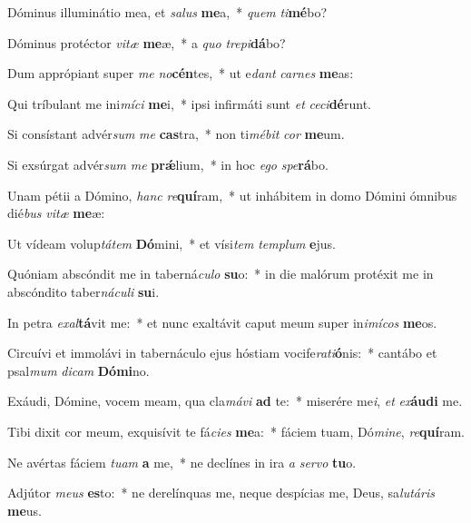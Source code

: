 \item Dóminus illuminátio mea, et \textit{sa}\textit{lus} \textbf{me}a,~* \textit{quem} \textit{ti}\textbf{mé}bo?
\item Dóminus protéctor \textit{vi}\textit{tæ} \textbf{me}æ,~* a \textit{quo} \textit{tre}\textit{pi}\textbf{dá}bo?
\item Dum apprópiant super \textit{me} \textit{no}\textbf{cén}tes,~* ut e\textit{dant} \textit{car}\textit{nes} \textbf{me}as:
\item Qui tríbulant me ini\textit{mí}\textit{ci} \textbf{me}i,~* ipsi infirmáti sunt \textit{et} \textit{ce}\textit{ci}\textbf{dé}runt.
\item Si consístant advér\textit{sum} \textit{me} \textbf{cas}tra,~* non ti\textit{mé}\textit{bit} \textit{cor} \textbf{me}um.
\item Si exsúrgat advér\textit{sum} \textit{me} \textbf{prǽ}lium,~* in hoc \textit{e}\textit{go} \textit{spe}\textbf{rá}bo.
\item Unam pétii a Dómino, \textit{hanc} \textit{re}\textbf{quí}ram,~* ut inhábitem in domo Dómini ómnibus dié\textit{bus} \textit{vi}\textit{tæ} \textbf{me}æ:
\item Ut vídeam volup\textit{tá}\textit{tem} \textbf{Dó}mini,~* et vísi\textit{tem} \textit{tem}\textit{plum} \textbf{e}jus.
\item Quóniam abscóndit me in taberná\textit{cu}\textit{lo} \textbf{su}o:~* in die malórum protéxit me in abscóndito taber\textit{ná}\textit{cu}\textit{li} \textbf{su}i.
\item In petra \textit{ex}\textit{al}\textbf{tá}vit me:~* et nunc exaltávit caput meum super in\textit{i}\textit{mí}\textit{cos} \textbf{me}os.
\item Circuívi et immolávi in tabernáculo ejus hóstiam vocife\textit{ra}\textit{ti}\textbf{ó}nis:~* cantábo et psal\textit{mum} \textit{di}\textit{cam} \textbf{Dó}\textbf{mi}no.
\item Exáudi, Dómine, vocem meam, qua cla\textit{má}\textit{vi} \textbf{ad} te:~* miserére me\textit{i}, \textit{et} \textit{ex}\textbf{áu}\textbf{di} me.
\item Tibi dixit cor meum, exquisívit te fá\textit{ci}\textit{es} \textbf{me}a:~* fáciem tuam, Dó\textit{mi}\textit{ne}, \textit{re}\textbf{quí}ram.
\item Ne avértas fáciem \textit{tu}\textit{am} \textbf{a} me,~* ne declínes in ira \textit{a} \textit{ser}\textit{vo} \textbf{tu}o.
\item Adjútor \textit{me}\textit{us} \textbf{es}to:~* ne derelínquas me, neque despícias me, Deus, sa\textit{lu}\textit{tá}\textit{ris} \textbf{me}us.

